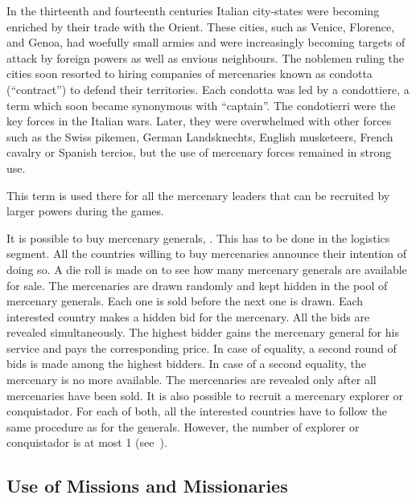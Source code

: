\begin{histoire}[Condottieri]
  In the thirteenth and fourteenth centuries Italian city-states were becoming
  enriched by their trade with the Orient. These cities, such as Venice,
  Florence, and Genoa, had woefully small armies and were increasingly
  becoming targets of attack by foreign powers as well as envious
  neighbours. The noblemen ruling the cities soon resorted to hiring companies
  of mercenaries known as condotta (``contract'') to defend their
  territories. Each condotta was led by a condottiere, a term which soon
  became synonymous with ``captain''. The condotierri were the key forces in
  the Italian wars. Later, they were overwhelmed with other forces such as the
  Swiss pikemen, German Landsknechts, English musketeers, French cavalry or
  Spanish tercios, but the use of mercenary forces remained in strong use.

  This term is used there for all the mercenary leaders that can be recruited
  by larger powers during the games.
\end{histoire}
\aparag It is possible to buy mercenary generals, . This has to be done in the
logistics segment.
\bparag All the countries willing to buy mercenaries announce their intention
of doing so.
\bparag A die roll is made on  to see how many
mercenary generals are available for sale.
\bparag The mercenaries are drawn randomly and kept hidden in the pool of
mercenary generals. Each one is sold before the next one is drawn.
\bparag Each interested country makes a hidden bid for the mercenary. All the
bids are revealed simultaneously.
\bparag The highest bidder gains the mercenary general for his service and
pays the corresponding price. In case of equality, a second round of bids is
made among the highest bidders. In case of a second equality, the mercenary is
no more available.
\bparag The mercenaries are revealed only after all mercenaries have been
sold.
\aparag It is also possible to recruit a mercenary explorer or
conquistador. For each of both, all the interested countries have to follow
the same procedure as for the generals.
\bparag However, the number of explorer or conquistador is at most 1
(see~).  



\subsection{Use of Missions and Missionaries}


